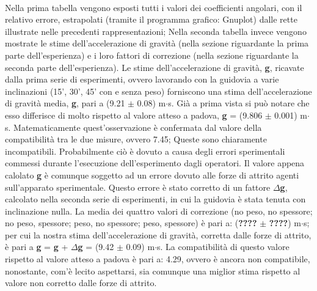 \documentclass[12pt]{article} %
\begin{document}
\paragraph{}
Nella prima tabella vengono esposti tutti i valori dei coefficienti angolari, con il relativo errore, estrapolati (tramite il programma grafico: Gnuplot) dalle rette illustrate nelle precedenti rappresentazioni;
Nella seconda tabella invece vengono mostrate le stime dell'accelerazione di gravità (nella sezione riguardante la prima parte dell'esperienza) e i loro fattori di correzione (nella sezione riguardante la seconda parte dell'esperienza).  
Le stime dell'accelerazione di gravità, \textbf{g}, ricavate dalla prima serie di esperimenti, ovvero lavorando con la guidovia a varie inclinazioni (15', 30', 45' con e senza peso) forniscono una stima dell'accelerazione di gravità media, \textbf{g}, pari a (9.21 $\pm$ 0.08) m$\cdot$s. Già a prima vista si può notare che esso differisce di molto rispetto al valore atteso a padova, \textbf{g} = (9.806 $\pm$ 0.001) m$\cdot$s. Matematicamente quest'osservazione è confermata dal valore della compatibilità tra le due misure, ovvero 7.45; Queste sono chiaramente incompatibili. Probabilmente ciò è dovuto a causa degli errori sperimentali commessi durante l'esecuzione dell'esperimento dagli operatori.
Il valore appena calolato \textbf{g} è comunque soggetto ad un errore dovuto alle forze di attrito agenti sull'apparato sperimentale. Questo errore è stato corretto di un fattore $\Delta$\textbf{g}, calcolato nella seconda serie di esperimenti, in cui la guidovia è stata tenuta con inclinazione nulla. La media dei quattro valori di correzione (no peso, no spessore; no peso, spessore; peso, no spessore; peso, spessore) è pari a: (\textbf{????} $\pm$ \textbf{????}) m$\cdot$s;
per cui la nostra stima dell'accelerazione di gravità, corretta dalle forze di attrito, è pari a \textbf{g} = \textbf{g} + $\Delta$\textbf{g} = (9.42 $\pm$ 0.09) m$\cdot$s.
La compatibilità di questo valore rispetto al valore atteso a padova è pari a: 4.29, ovvero è ancora non compatibile, nonostante, com'è lecito aspettarsi, sia comunque una miglior stima rispetto al valore non corretto dalle forze di attrito. 
\end{document}
